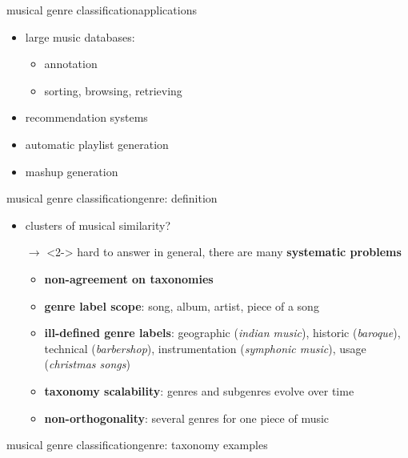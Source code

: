         \begin{frame}{musical genre classification}{applications}
            \begin{itemize}
                \item	large music databases:
                    \begin{itemize}
                        \item	annotation
                        \item	sorting, browsing, retrieving
                    \end{itemize}
                \item recommendation systems
                \item	automatic playlist generation
                \item	mashup generation
            \end{itemize}
        \end{frame}

        \begin{frame}{musical genre classification}{genre: definition}

            \begin{itemize}
                \item   clusters of musical similarity?
                \item[$\rightarrow$]<2->             hard to answer in general, there are many \textbf{systematic problems}
                    \begin{itemize}
                        \item<3->	\textbf{non-agreement on taxonomies}
                        \item<4->   \textbf{genre label scope}: song, album, artist, piece of a song
                        \item<5->	\textbf{ill-defined genre labels}: geographic (\textit{indian music}), historic (\textit{baroque}), technical (\textit{barbershop}), instrumentation (\textit{symphonic music}), usage (\textit{christmas songs})
                        \item<6->	\textbf{taxonomy scalability}: genres and subgenres evolve over time
                        \item<7->	\textbf{non-orthogonality}: several genres for one piece of music
                    \end{itemize}

            \end{itemize}
            
        \end{frame}
        \begin{frame}{musical genre classification}{genre: taxonomy examples}
                \vspace{-20mm}
                \begin{center}
                \scalebox{.6}
                {
                    
                }
                \end{center}
        \end{frame}


